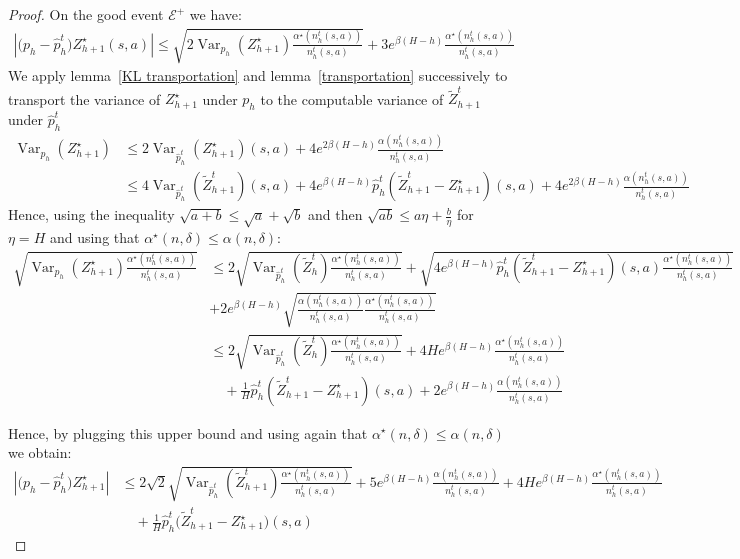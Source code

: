 \documentclass[final,12pt]{colt2026} %
\begin{document}
\begin{proof}
    On the good event $\mathcal{E}^+$ we have:
    \begin{align*}
          | \big(p_h - \widehat{p}_h^t\big)Z_{h+1}^\star(s,a)| \leq \sqrt{2 \operatorname{Var}_{p_h}(Z_{h+1}^\star) \frac{\alpha^\star(n_h^t(s,a))}{n_h^t(s,a)}} + 3e^{\beta (H - h)} \frac{\alpha^\star(n_h^t(s,a))}{n_h^t(s,a)}
    \end{align*}
    We apply lemma~\ref{KL transportation} and lemma~\ref{transportation} successively to transport the variance of $Z_{h+1}^\star$ under $p_h$ to the computable variance of $\widetilde Z_{h+1}^t$ under $\widehat{p}_h^t$ 
\begin{align*}
\operatorname{Var}_{p_h}(Z_{h+1}^{\star}) &\leq 2 \operatorname{Var}_{\widehat{p}^t_h}(Z_{h+1}^{\star})(s,a) + 4 e^{2 \beta  (H - h)} \frac{\alpha(n_h^t(s,a))}{n_h^t(s,a)} \\
&\leq 4 \operatorname{Var}_{\widehat{p}^t_h}(\widetilde{Z}^t_{h+1})(s,a) + 4 e^{\beta  (H - h )} \widehat{p}_h^t(\widetilde{Z}^t_{h+1} - Z_{h+1}^{\star})(s,a) + 4 e^{2 \beta  (H - h )} \frac{\alpha(n_h^t(s,a))}{n_h^t(s,a)}
    \end{align*}
    Hence, using the inequality $\sqrt{a + b} \leq \sqrt{a} + \sqrt{b}$ and then $\sqrt{ab} \leq a \eta + \frac{b}{\eta}$ for $\eta = H$ and using that $\alpha^\star(n,\delta) \leq \alpha(n,\delta)$: 
\begin{align*}
\sqrt{\operatorname{Var}_{p_h}(Z_{h+1}^{\star})\frac{\alpha^\star(n_h^t(s,a))}{n_h^t(s,a)}} &\leq 2\sqrt{\operatorname{Var}_{\widehat{p}_h^t}(\widetilde{Z}_h^t)\frac{\alpha^\star(n_h^t(s,a))}{n_h^t(s,a)}} + \sqrt{4 e^{\beta  (H - h)} \widehat{p}_h^t(\widetilde{Z}^t_{h+1} - Z_{h+1}^{\star})(s,a)\frac{\alpha^\star(n_h^t(s,a))}{n_h^t(s,a)}}\\& + 2 e^{\beta (H - h )} \sqrt{\frac{\alpha(n_h^t(s,a))}{n_h^t(s,a)} \frac{\alpha^\star(n_h^t(s,a))}{n_h^t(s,a)} }\\
& \leq 2\sqrt{\operatorname{Var}_{\widehat{p}_h^t}(\widetilde Z_h^t)\frac{\alpha^\star(n_h^t(s,a))}{n_h^t(s,a)}} + 4 He^{\beta  (H - h)} \frac{\alpha^\star(n_h^t(s,a))}{n_h^t(s,a)} \\ &\quad + \frac{1}{H} \widehat{p}_h^t(\widetilde{Z}^t_{h+1} - Z_{h+1}^{\star})(s,a) + 2 e^{\beta  (H - h )} \frac{\alpha(n_h^t(s,a))}{n_h^t(s,a)}
\end{align*}

Hence, by plugging this upper bound and using again that $\alpha^\star(n,\delta) \leq \alpha(n,\delta)$ we obtain:
\begin{align*}
    | \big(p_h - \widehat{p}_h^t\big)Z_{h+1}^{\star}| &\leq 2\sqrt{2}\sqrt{\operatorname{Var}_{\widehat{p}_h^t}(\widetilde Z_{h+1}^t)\frac{\alpha^\star(n_h^t(s,a))}{n_h^t(s,a)}} + 5 e^{\beta  (H - h )} \frac{\alpha(n_h^t(s,a))}{n_h^t(s,a)} + 4 He^{ \beta  (H - h)} \frac{\alpha^\star(n_h^t(s,a))}{n_h^t(s,a)}\\ &\quad+  \frac{1}{H} \widehat{p}_h^t\Big(\widetilde{Z}^t_{h+1} - Z_{h+1}^{\star}\Big)(s,a)
\end{align*}

\end{proof}
\end{document}
